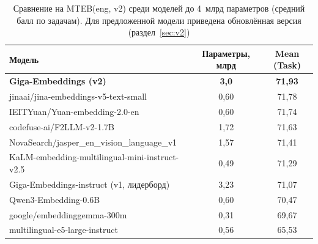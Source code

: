 \documentclass[12pt,a4paper]{article}
\begin{document}
\begin{table}[ht]
  \centering
  \caption{Сравнение на MTEB(eng, v2) среди моделей до 4~млрд параметров
  (средний балл по задачам). Для предложенной модели приведена обновлённая
  версия (раздел~\ref{sec:v2})}\label{tab:eng}
  \begin{tabular}{lcc}
    \toprule
    Модель & Параметры, млрд & Mean (Task) \\
    \midrule
    \textbf{Giga-Embeddings (v2)}                    & \textbf{3,0}  & \textbf{71,93} \\
    jinaai/jina-embeddings-v5-text-small             & 0,60 & 71,78 \\
    IEITYuan/Yuan-embedding-2.0-en                   & 0,60 & 71,74 \\
    codefuse-ai/F2LLM-v2-1.7B                        & 1,72 & 71,63 \\
    NovaSearch/jasper\_en\_vision\_language\_v1      & 1,57 & 71,41 \\
    KaLM-embedding-multilingual-mini-instruct-v2.5   & 0,49 & 71,29 \\
    Giga-Embeddings-instruct (v1, лидерборд)         & 3,23 & 71,07 \\
    Qwen3-Embedding-0.6B                             & 0,60 & 70,47 \\
    google/embeddinggemma-300m                       & 0,31 & 69,67 \\
    multilingual-e5-large-instruct                   & 0,56 & 65,53 \\
    \bottomrule
  \end{tabular}
\end{table}
\end{document}

